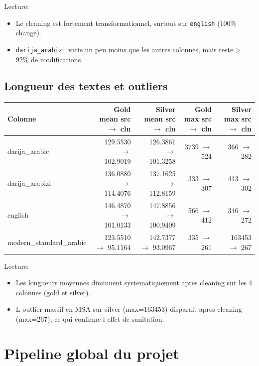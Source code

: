 \documentclass[11pt,a4paper]{article}
\begin{document}
\noindent Lecture:
\begin{itemize}[leftmargin=*]
  \item Le cleaning est fortement transformationnel, surtout sur \texttt{english} (100\% change).
  \item \texttt{darija\_arabizi} varie un peu moins que les autres colonnes, mais reste > 92\% de modifications.
\end{itemize}

\subsection{Longueur des textes et outliers}
\begin{center}
\begin{tabular}{lrrrr}
\toprule
Colonne & Gold mean src $\rightarrow$ cln & Silver mean src $\rightarrow$ cln & Gold max src $\rightarrow$ cln & Silver max src $\rightarrow$ cln \\
\midrule
darija\_arabic & 129.5530 $\rightarrow$ 102.9019 & 126.3861 $\rightarrow$ 101.3258 & 3739 $\rightarrow$ 524 & 366 $\rightarrow$ 282 \\
darija\_arabizi & 136.0880 $\rightarrow$ 114.4076 & 137.1625 $\rightarrow$ 112.8159 & 333 $\rightarrow$ 307 & 413 $\rightarrow$ 302 \\
english & 146.4870 $\rightarrow$ 101.0133 & 147.8856 $\rightarrow$ 100.9409 & 566 $\rightarrow$ 412 & 346 $\rightarrow$ 272 \\
modern\_standard\_arabic & 123.5510 $\rightarrow$ 95.1164 & 142.7377 $\rightarrow$ 93.0967 & 335 $\rightarrow$ 261 & 163453 $\rightarrow$ 267 \\
\bottomrule
\end{tabular}
\end{center}

\noindent Lecture:
\begin{itemize}[leftmargin=*]
  \item Les longueurs moyennes diminuent systematiquement apres cleaning sur les 4 colonnes (gold et silver).
  \item L outlier massif en MSA sur silver (max=163453) disparait apres cleaning (max=267), ce qui confirme l effet de sanitation.
\end{itemize}

\section{Pipeline global du projet}
\end{document}
